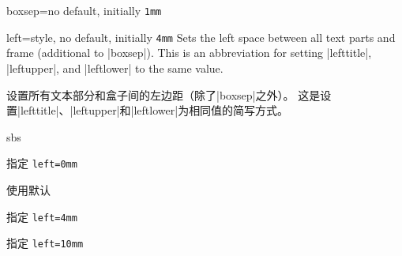 \begin{docTcbKey}{boxsep}{=}{no default, initially \texttt{1mm}}
\end{docTcbKey}


\begin{docTcbKey}{left}{=}{style, no default, initially \texttt{4mm}}
Sets the left space between all text parts and frame (additional to |boxsep|).
This is an abbreviation for setting
|lefttitle|, |leftupper|, and |leftlower| to the same value.

设置所有文本部分和盒子间的左边距（除了|boxsep|之外）。 这是设置|lefttitle|、|leftupper|和|leftlower|为相同值的简写方式。


\begin{dispExample*}{sbs}

\begin{tcolorbox}[left=0mm]
指定 \verb|left=0mm|
\end{tcolorbox}

\begin{tcolorbox}
使用默认
\end{tcolorbox}

\begin{tcolorbox}[left=4mm]
指定 \verb|left=4mm|
\end{tcolorbox}


\begin{tcolorbox}[left=10mm]
指定 \verb|left=10mm|
\end{tcolorbox}
\end{dispExample*}
\end{docTcbKey}

